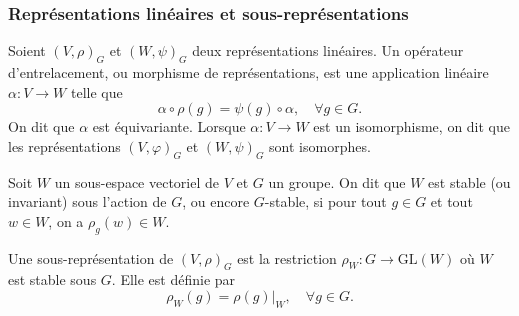 \documentclass[9pt]{beamer}
\begin{document}
\begin{frame}
	\frametitle{Représentations linéaires et sous-représentations}
	
	\begin{definition} \cite{serre1971representation}
Soient \( (V, \rho)_{G} \) et \( (W, \psi)_{G} \) deux représentations linéaires. Un opérateur d'entrelacement, ou morphisme de représentations, est une application linéaire \( \alpha : V \to W \) telle que
		\[
		\alpha \circ \rho(g) = \psi(g) \circ \alpha, \quad \forall g \in G.
		\]
On dit que \( \alpha \) est équivariante. Lorsque \( \alpha : V \to W \) est un isomorphisme, on dit que les représentations \( (V, \varphi)_{G} \) et \( (W, \psi)_{G} \) sont isomorphes.
	\end{definition}
	

	
	\begin{definition} 
Soit \( W \) un sous-espace vectoriel de \( V \) et \( G \) un groupe. On dit que \( W \) est stable (ou invariant) sous l'action de \( G \), ou encore \( G \)-stable, si pour tout \( g \in G \) et tout \( w \in W \), on a \( \rho_g(w) \in W \).
	\end{definition}
	

	
	\begin{definition}
Une sous-représentation de \( (V,\rho)_{G} \) est la restriction \( \rho_W : G \rightarrow \mathrm{GL}(W) \) où \( W \) est stable sous \( G \). Elle est définie par
		\[
		\rho_W(g) = \rho(g)|_W, \quad \forall g \in G.
		\]
	\end{definition}
	
\end{frame}
\end{document}
